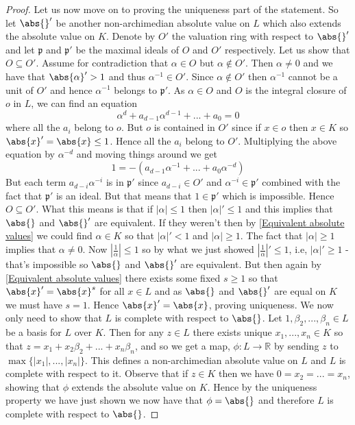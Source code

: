 \documentclass{article}
\newcommand{\mfrak}[1]{\mathfrak{#1}}
\newcommand{\mbb}[1]{\mathbb{#1}}
\numberwithin{equation}{section}
\begin{document}
\begin{proof}
	Let us now move on to proving the uniqueness part of the statement. So let $\abs{}'$ be another non-archimedian absolute value on $L$ which also extends the absolute value on $K$. Denote by $O'$ the valuation ring with respect to $\abs{}'$ and let $\mfrak p$ and $\mfrak p'$ be the maximal ideals of $O$ and $O'$ respectively. Let us show that $O \subseteq O'$. Assume for contradiction that $\alpha \in O$ but $\alpha \notin O'$. Then $\alpha \neq 0$ and we have that $\abs{\alpha}' > 1$ and thus $\alpha^{-1} \in O'$. Since $\alpha \notin O'$ then $\alpha^{-1}$ cannot be a unit of $O'$ and hence $\alpha^{-1}$ belongs to $\mfrak p'$. As $\alpha \in O$ and $O$ is the integral closure of $o$ in $L$, we can find an equation
	$$\alpha^d + a_{d-1}\alpha^{d-1} + ... + a_0 = 0$$
	where all the $a_i$ belong to $o$. But $o$ is contained in $O'$ since if $x \in o$ then $x \in K$ so $\abs{x}' = \abs{x} \leq 1$. Hence all the $a_i$ belong to $O'$. Multiplying the above equation by $\alpha^{-d}$ and moving things around we get $$1 = -(a_{d-1}\alpha^{-1} + ... + a_0\alpha^{-d})$$
	But each term $a_{d-i} \alpha^{-i}$ is in $\mfrak p'$ since $a_{d-i} \in O'$ and $\alpha^{-i} \in \mfrak p'$ combined with the fact that $\mfrak p'$ is an ideal. But that means that $1 \in \mfrak p'$ which is impossible. Hence $O \subseteq O'$. What this means is that if $|\alpha| \leq 1$ then $|\alpha|' \leq 1$ and this implies that $\abs{}$ and $\abs{}'$ are equivalent. If they weren't then by \cref{Equivalent absolute values} we could find $\alpha \in K$ so that $|\alpha|' < 1$ and $|\alpha| \geq 1$. The fact that $|\alpha| \geq 1$ implies that $\alpha \neq 0$. Now $|\frac{1}{\alpha}| \leq 1$ so by what we just showed $|\frac{1}{\alpha}|' \leq 1$, i.e, $|\alpha|' \geq 1$ - that's impossible so $\abs{}$ and $\abs{}'$ are equivalent. But then again by \cref{Equivalent absolute values} there exists some fixed $s \geq 1$ so that $\abs{x}' = \abs{x}^s$ for all $x \in L$ and as $\abs{}$ and $\abs{}'$ are equal on $K$ we must have $s = 1$. Hence $\abs{x}' = \abs{x}$, proving uniqueness. We now only need to show that $L$ is complete with respect to $\abs{}$. Let $1, \beta_2, ..., \beta_{n} \in L$ be a basis for $L$ over $K$. Then for any $z \in L$ there exists unique $x_1, ..., x_n \in K$ so that $z = x_1 + x_2 \beta_2 + ... + x_{n}\beta_{n}$, and so we get a map, $\phi : L \to \mbb R$ by sending $z$ to $\max \{|x_1|, ...,|x_n|\}$. This defines a non-archimedian absolute value on $L$ and $L$ is complete with respect to it.
	Observe that if $z \in K$ then we have $0 = x_2 = ... = x_n$, showing that $\phi$ extends the absolute value on $K$. Hence by the uniqueness property we have just shown we now have that $\phi = \abs{}$ and therefore $L$ is complete with respect to $\abs{}$.


\end{proof}
\end{document}
